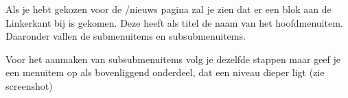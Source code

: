 Als je hebt gekozen voor de /nieuws pagina zal je zien dat er een blok aan de Linkerkant bij is gekomen. Deze heeft als titel de naam van het hoofdmenuitem. Daaronder vallen de submenuitems en subsubmenuitems.

Voor het aanmaken van subsubmenuitems volg je dezelfde stappen maar geef je een menuitem op als bovenliggend onderdeel, dat een niveau dieper ligt (zie screenshot)
\begin{center}
\end{center}